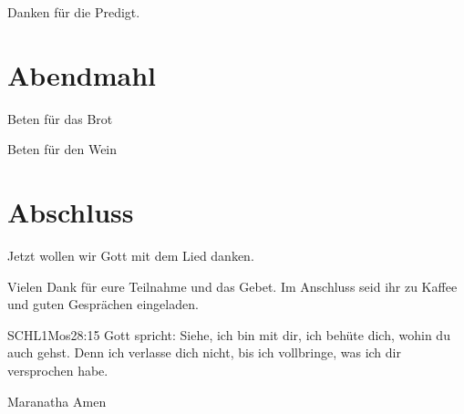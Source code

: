\documentclass{../inc/mybib}
\begin{document}
Danken für die Predigt.

\section{Abendmahl}

Beten für das Brot


Beten für den Wein



\section{Abschluss}

Jetzt wollen wir Gott mit dem Lied  danken.


Vielen Dank für eure Teilnahme und das Gebet. Im Anschluss seid ihr zu Kaffee und guten Gesprächen eingeladen.
\beten{}

\begin{bibelbox}{SCHL}{1Mos}{28:15}
Gott spricht: Siehe, ich bin mit dir,
ich behüte dich, wohin du auch gehst.
Denn ich verlasse dich nicht,
bis ich vollbringe, was ich dir versprochen habe.
\end{bibelbox}

Maranatha Amen
\end{document}
